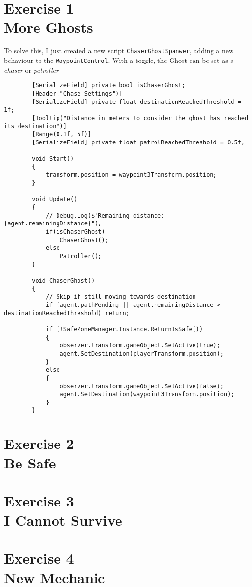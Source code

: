 \section[Exersice 1. More Ghosts]{Exercise 1\\ {\large More Ghosts}}

    To solve this, I just created a new script \texttt{ChaserGhostSpanwer}, adding a new behaviour to the \texttt{WaypointControl}. With a toggle, the Ghost can be set as a \textit{chaser} or \textit{patroller}

    \begin{verbatim}
        [SerializeField] private bool isChaserGhost;
        [Header("Chase Settings")]
        [SerializeField] private float destinationReachedThreshold = 1f;
        [Tooltip("Distance in meters to consider the ghost has reached its destination")]
        [Range(0.1f, 5f)]
        [SerializeField] private float patrolReachedThreshold = 0.5f;

        void Start()
        {
            transform.position = waypoint3Transform.position;
        }

        void Update()
        {
            // Debug.Log($"Remaining distance: {agent.remainingDistance}");
            if(isChaserGhost)
                ChaserGhost();
            else
                Patroller();
        }

        void ChaserGhost()
        {
            // Skip if still moving towards destination
            if (agent.pathPending || agent.remainingDistance > destinationReachedThreshold) return;

            if (!SafeZoneManager.Instance.ReturnIsSafe())
            {
                observer.transform.gameObject.SetActive(true);
                agent.SetDestination(playerTransform.position);
            }
            else
            {
                observer.transform.gameObject.SetActive(false);
                agent.SetDestination(waypoint3Transform.position);
            }
        }
    \end{verbatim}

\section[Exersice 2. Be Safe]{Exercise 2\\ {\large Be Safe}}

\section[Exercise 3. I Cannot Survive]{Exercise 3\\ {\large I Cannot Survive}}

\section[Exercise 4. New Mechanic]{Exercise 4\\ {\large New Mechanic}}
